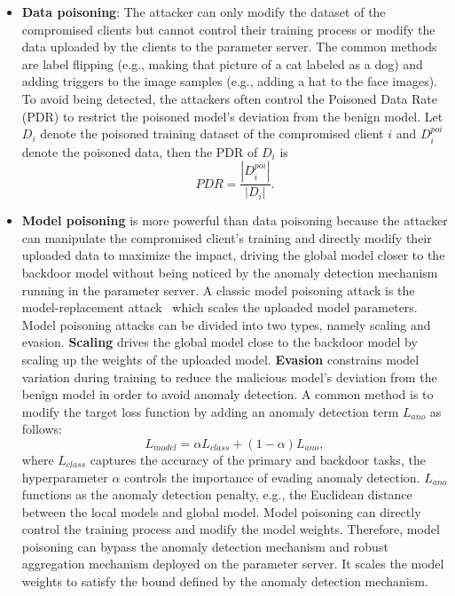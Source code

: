 \begin{itemize}
  \item \textbf{Data poisoning}: The attacker can only modify the dataset of the compromised clients but cannot control their training process or modify the data uploaded by the clients to the parameter server. The common methods are label flipping (e.g., making that picture of a cat labeled as a dog) and adding triggers to the image samples (e.g., adding a hat to the face images). To avoid being detected, the attackers often control the Poisoned Data Rate (PDR) to restrict the poisoned model's deviation from the benign model. Let $D_{i}$ denote the poisoned training dataset of the compromised client $i$ and $D_{i}^{poi}$ denote the poisoned data, then the PDR of $ D_{i} $ is
\begin{equation}
 PDR=\frac{\left | D_{i}^{poi} \right | }{\left | D_{i} \right | }.  
 \end{equation}
  \item \textbf{Model poisoning} is more powerful than data poisoning because the attacker can manipulate the compromised client's training and directly modify their uploaded data to maximize the impact, driving the global model closer to the backdoor model without being noticed by the anomaly detection mechanism running in the parameter server. A classic model poisoning attack is the model-replacement attack~\cite{howtobackdoor} which scales the uploaded model parameters. 
Model poisoning attacks can be divided into two types, namely scaling and evasion.
\textbf{Scaling} drives the global model close to the backdoor model by scaling up the weights of the uploaded model.
\textbf{Evasion} constrains model variation during training to reduce the malicious model's deviation from the benign model in order to avoid anomaly detection. A common method is to modify the target loss function by adding an anomaly detection term $L_{ano}$ as follows:
\begin{equation}
L_{model} = \alpha L_{class}+\left ( 1-\alpha  \right ) L_{ano},
\end{equation}
where $L_{class}$ captures the accuracy of the primary and backdoor tasks, the hyperparameter $\alpha$ controls the importance of evading anomaly detection. $L_{ano}$ functions as the anomaly detection penalty, e.g., the Euclidean distance between the local models and global model.
Model poisoning can directly control the training process and modify the model weights. Therefore, model poisoning can bypass the anomaly detection mechanism and robust aggregation mechanism deployed on the parameter server. It scales the model weights to satisfy the bound defined by the anomaly detection mechanism.
\end{itemize}
